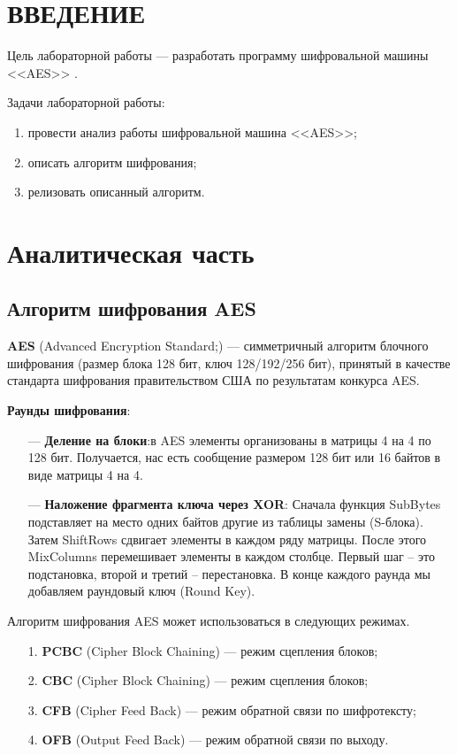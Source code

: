 \section*{\large{ВВЕДЕНИЕ}}

Цель лабораторной работы --- разработать программу шифровальной машины <<AES>> \cite{Enigma}.

Задачи лабораторной работы:

\begin{enumerate}
    \item провести анализ работы шифровальной машина <<AES>>;
    \item описать алгоритм шифрования;
    \item релизовать описанный алгоритм.
\end{enumerate}

\clearpage
\section{Аналитическая часть}

\subsection{Алгоритм шифрования AES}

\textbf{AES} (Advanced Encryption Standard;) \cite{Enigma} --- симметричный алгоритм блочного шифрования (размер блока 128 бит, ключ 128/192/256 бит), принятый в качестве стандарта шифрования правительством США по результатам конкурса AES.

\textbf{Раунды шифрования}:

\begin{itemize}
	\item[---] \textbf{Деление на блоки}:в AES элементы организованы в матрицы 4 на 4 по 128 бит. Получается, нас есть сообщение размером 128 бит или 16 байтов в виде матрицы 4 на 4.
	\item[---] \textbf{Наложение фрагмента ключа через XOR}: Сначала функция SubBytes подставляет на место одних байтов другие из таблицы замены (S-блока). Затем ShiftRows сдвигает элементы в каждом ряду матрицы. После этого MixColumns перемешивает элементы в каждом столбце. Первый шаг – это подстановка, второй и третий – перестановка. В конце каждого раунда мы добавляем раундовый ключ (Round Key).
\end{itemize}

Алгоритм шифрования AES может использоваться в следующих режимах.

\begin{enumerate}
	\item[1.] \textbf{PCBC} (Cipher Block Chaining) --- режим сцепления блоков;
	\item[2.] \textbf{CBC} (Cipher Block Chaining) --- режим сцепления блоков;
	\item[3.] \textbf{CFB} (Cipher Feed Back) --- режим обратной связи по шифротексту;
	\item[4.] \textbf{OFB} (Output Feed Back) --- режим обратной связи по выходу.
\end{enumerate}


